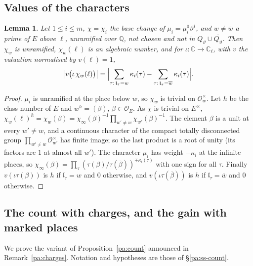 \documentclass[10pt]{amsart}
\newtheorem{lemma}[theorem]{Lemma}
\theoremstyle{definition}
\theoremstyle{remark}
\newcommand{\C}{\mathbb C}
\newcommand{\Q}{\mathbb Q}
\providecommand{\auO}{\mathcal O}
\providecommand{\aubar}[1]{\overline{#1}}
\begin{document}
\subsection{Values of the characters}\label{pl:ss-char}
\begin{lemma}\label{pl:char}
Let $1\le i\le m$, $\chi=\chi_i$ the base change of $\mu_i=\mu_i^0\vartheta^i$, and $w\ne\aubar w$
a prime of $E$ above $\ell$, unramified over $\Q$, not chosen and not in $Q_\vartheta\cup\aubar{
Q_\vartheta}$. Then $\chi_w$ is unramified, $\chi_w(\ell)$ is an algebraic number, and for
$\iota\colon\C\to\C_\ell$, with $v$ the valuation normalised by $v(\ell)=1$,
\[
\bigl|v\bigl(\iota\,\chi_w(\ell)\bigr)\bigr|=\Bigl|\sum_{\tau:\,\mathfrak l_\tau=w}\kappa_i(\tau)-
\sum_{\tau:\,\mathfrak l_\tau=\aubar w}\kappa_i(\tau)\Bigr| .
\]
\end{lemma}
\begin{proof}
$\mu_i$ is unramified at the place below $w$, so $\chi_w$ is trivial on $\auO_w^\times$. Let $h$ be
the class number of $E$ and $w^h=(\beta)$, $\beta\in\auO_E$. As $\chi$ is trivial on $E^\times$,
$\chi_w(\ell)^h=\chi_w(\beta)=\chi_\infty(\beta)^{-1}\prod_{w'\ne w}\chi_{w'}(\beta)^{-1}$. The
element $\beta$ is a unit at every $w'\ne w$, and a continuous character of the compact totally
disconnected group $\prod_{w'\ne w}\auO_{w'}^\times$ has finite image; so the last product is a root
of unity (its factors are $1$ at almost all $w'$). The character $\mu_i$ has weight $-\kappa_i$ at the infinite
places, so $\chi_\infty(\beta)=\prod_\tau(\tau(\beta)/\tau(\aubar\beta))^{\mp\kappa_i(\tau)}$ with
one sign for all $\tau$. Finally $v(\iota\tau(\beta))$ is $h$ if $\mathfrak l_\tau=w$ and $0$
otherwise, and $v(\iota\tau(\aubar\beta))$ is $h$ if $\mathfrak l_\tau=\aubar w$ and $0$
otherwise.
\end{proof}

\subsection{The count with charges, and the gain with marked places}\label{pl:ss-count}
We prove the variant of Proposition~\ref{pa:count} announced in Remark~\ref{pa:charges}. Notation
and hypotheses are those of \S\ref{pa:ss-count}.
\end{document}
